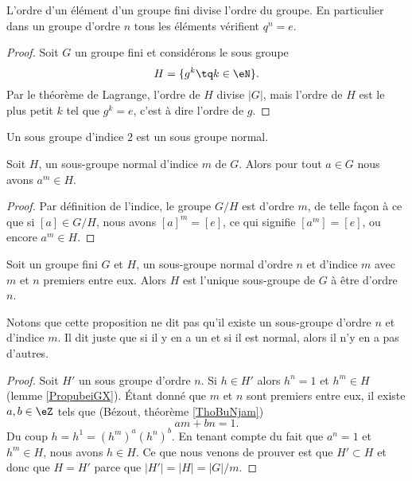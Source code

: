 \begin{corollary}       \label{CorpZItFX}
    L'ordre d'un élément d'un groupe fini divise l'ordre du groupe. En particulier dans un groupe d'ordre \( n\) tous les éléments vérifient \( q^n=e\).
\end{corollary}

\begin{proof}
    Soit \( G\) un groupe fini et considérons le sous groupe
    \begin{equation}
        H=\{ g^k\tq k\in\eN \}.
    \end{equation}
    Par le théorème de Lagrange, l'ordre de \( H\) divise \( | G |\), mais l'ordre de \( H\) est le plus petit \( k\) tel que \( g^k=e\), c'est à dire l'ordre de \( g\).
\end{proof}

\begin{lemma}    \label{LemSkIOOG}
    Un sous groupe d'indice \( 2\) est un sous groupe normal.
\end{lemma}

\begin{lemma}\label{PropubeiGX}
    Soit \( H\), un sous-groupe normal d'indice \( m\) de \( G\). Alors pour tout \( a\in G\) nous avons \( a^m\in H\).
\end{lemma}

\begin{proof}
    Par définition de l'indice, le groupe \( G/H\) est d'ordre \( m\), de telle façon à ce que si \( [a]\in G/H\), nous avons \( [a]^m=[e]\), ce qui signifie \( [a^m]=[e]\), ou encore \( a^m\in H\).
\end{proof}

\begin{proposition}
    Soit un groupe fini \( G\) et \( H\), un sous-groupe normal d'ordre \( n\) et d'indice \( m\) avec \( m\) et \( n\) premiers entre eux. Alors \( H\) est l'unique sous-groupe de \( G\) à être d'ordre \( n\).
\end{proposition}
Notons que cette proposition ne dit pas qu'il existe un sous-groupe d'ordre \( n\) et d'indice \( m\). Il dit juste que si il y en a un et si il est normal, alors il n'y en a pas d'autres.

\begin{proof}
    Soit \( H'\) un sous groupe d'ordre \( n\). Si \( h\in H'\) alors \( h^n=1\) et \( h^m\in H\) (lemme \ref{PropubeiGX}). Étant donné que \( m\) et \( n\) sont premiers entre eux, il existe \( a,b\in \eZ\) tels que (Bézout, théorème \ref{ThoBuNjam})
    \begin{equation}
        am+bn=1.
    \end{equation}
    Du coup \( h=h^1=(h^m)^a(h^n)^b\). En tenant compte du fait que \( a^n=1\) et \( h^m\in H\), nous avons \( h\in H\). Ce que nous venons de prouver est que \( H'\subset H\) et donc que \( H=H'\) parce que \( | H' |=| H |=| G |/m\).
\end{proof}

